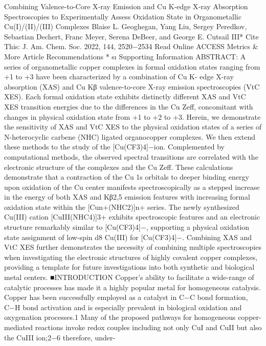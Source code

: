 \documentclass{article}
\begin{document}

Combining Valence-to-Core X‑ray Emission and Cu K‑edge X‑ray
Absorption Spectroscopies to Experimentally Assess Oxidation State
in Organometallic Cu(I)/(II)/(III) Complexes
Blaise L. Geoghegan, Yang Liu, Sergey Peredkov, Sebastian Dechert, Franc Meyer, Serena DeBeer,
and George E. Cutsail III*
Cite This: J. Am. Chem. Soc. 2022, 144, 2520−2534
Read Online
ACCESS
Metrics \& More
Article Recommendations
*
sı
Supporting Information
ABSTRACT: A series of organometallic copper complexes in formal oxidation
states ranging from +1 to +3 have been characterized by a combination of Cu K-
edge X-ray absorption (XAS) and Cu Kβ valence-to-core X-ray emission
spectroscopies (VtC XES). Each formal oxidation state exhibits distinctly
diﬀerent XAS and VtC XES transition energies due to the diﬀerences in the Cu
Zeff, concomitant with changes in physical oxidation state from +1 to +2 to +3.
Herein, we demonstrate the sensitivity of XAS and VtC XES to the physical
oxidation states of a series of N-heterocyclic carbene (NHC) ligated
organocopper complexes. We then extend these methods to the study of the
[Cu(CF3)4]−ion. Complemented by computational methods, the observed
spectral transitions are correlated with the electronic structure of the complexes
and the Cu Zeff. These calculations demonstrate that a contraction of the Cu 1s orbitals to deeper binding energy upon oxidation of
the Cu center manifests spectroscopically as a stepped increase in the energy of both XAS and Kβ2,5 emission features with increasing
formal oxidation state within the [Cun+(NHC2)]n+ series. The newly synthesized Cu(III) cation [CuIII(NHC4)]3+ exhibits
spectroscopic features and an electronic structure remarkably similar to [Cu(CF3)4]−, supporting a physical oxidation state
assignment of low-spin d8 Cu(III) for [Cu(CF3)4]−. Combining XAS and VtC XES further demonstrates the necessity of combining
multiple spectroscopies when investigating the electronic structures of highly covalent copper complexes, providing a template for
future investigations into both synthetic and biological metal centers.
■INTRODUCTION
Copper’s ability to facilitate a wide-range of catalytic processes
has made it a highly popular metal for homogeneous catalysis.
Copper has been successfully employed as a catalyst in C−C
bond formation, C−H bond activation and is especially
prevalent in biological oxidation and oxygenation processes.1
Many of the proposed pathways for homogeneous copper-
mediated reactions invoke redox couples including not only
CuI and CuII but also the CuIII ion;2−6 therefore, under-
\end{document}
